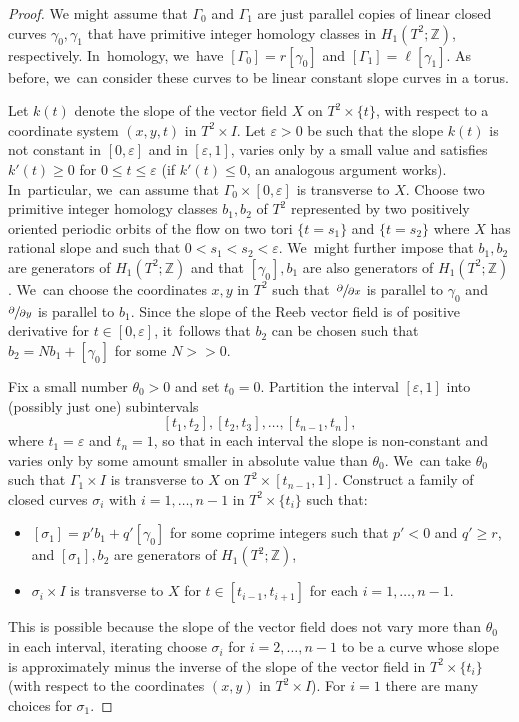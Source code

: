 \documentclass[11pt]{article}
\newcommand{\spp}[2]{\sfrac{\partial#1}{\partial#2}}
\theoremstyle{definition}
\begin{document}
\begin{proof}
We might assume that $\Gamma_0$ and $\Gamma_1$ are just parallel copies of linear closed curves $\gamma_0, \gamma_1$ that have primitive integer homology classes in $H_1(T^2;\mathbb{Z})$, respectively. In~homology, we~have $[\Gamma_0]=r[\gamma_0]$ and $[\Gamma_1]=\ell[\gamma_1]$. As before, we~can consider these curves to be linear constant slope curves in a torus.

Let $k(t)$ denote the slope of the vector field $X$ on $T^2\times \{t\}$, with respect to a coordinate system $(x,y,t)$ in $T^2\times I$. Let $\varepsilon>0$ be such that the slope $k(t)$ is not constant in $[0,\varepsilon]$ and in $[\varepsilon, 1]$, varies only by a small value and satisfies $k'(t)\geq 0$ for $0\leq t\leq \varepsilon$ (if $k'(t)\leq 0$, an analogous argument works). In~particular, we~can assume that $\Gamma_0\times [0, \varepsilon]$ is transverse to $X$. Choose two primitive integer homology classes $b_1, b_2$ of $T^2$ represented by two positively oriented periodic orbits of the flow on two tori $\{t=s_1\}$ and $\{t=s_2\}$ where $X$ has rational slope and such that $0<s_1<s_2<\varepsilon$. We~might further impose that $b_1,b_2$ are generators of $H_1(T^2;\mathbb{Z})$ and that $[\gamma_0],b_1$ are also generators of $H_1(T^2;\mathbb{Z})$. We~can choose the coordinates $x,y$ in $T^2$ such that~$\spp{}{x}$ is parallel to $\gamma_0$ and $\spp{}{y}$ is parallel to $b_1$. Since the slope of the Reeb vector field is of positive derivative for $t\in [0,\varepsilon]$, it~follows that $b_2$ can be chosen such that $b_2=Nb_1+[\gamma_0]$ for some $N>>0$.

Fix a small number $\theta_0>0$ and set $t_0=0$. Partition the interval $[\varepsilon,1]$ into (possibly just one) subintervals
\[
[t_1,t_2], [t_2,t_3],\dots, [t_{n-1},t_n],
\]
where $t_1=\varepsilon$ and $t_n=1$, so that in each interval the slope is non-constant and varies only by some amount smaller in absolute value than $\theta_0$. We~can take $\theta_0$ such that $\Gamma_1\times I$ is transverse to $X$ on $T^2\times [t_{n-1},1]$. Construct a family of closed curves $\sigma_i$ with $i=1,\dots,n-1$ in $T^2\times \{t_i\}$ such that:
\begin{itemize}
\item
$[\sigma_1]=p'b_1+q'[\gamma_0]$ for some coprime integers such that $p'<0$ and $q'\geq r$, and $[\sigma_1],b_2$ are generators of $H_1(T^2;\mathbb{Z})$,
\item
$\sigma_i\times I$ is transverse to $X$ for $t\in[t_{i-1},t_{i+1}]$ for each $i=1,\dots,n-1$.
\end{itemize}
This is possible because the slope of the vector field does not vary more than $\theta_0$ in each interval, iterating choose $\sigma_i$ for $i=2,\dots,n-1$ to be a curve whose slope is approximately minus the inverse of the slope of the vector field in $T^2\times \{t_i\}$ (with respect to the coordinates $(x,y)$ in $T^2 \times I$). For $i=1$ there are many choices for $\sigma_1$.


\end{proof}
\end{document}

